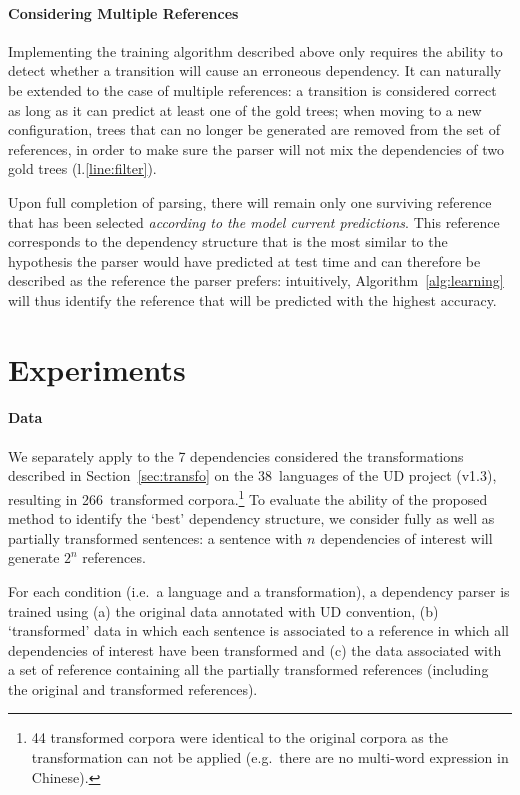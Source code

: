 \documentclass[11pt,letterpaper]{article}
\begin{document}
\paragraph*{Considering Multiple References} Implementing the training
algorithm described above only requires the ability to detect whether
a transition will cause an erroneous dependency. It can naturally be
extended to the case of multiple references: a transition is
considered correct as long as it can predict at least one of the gold
trees; when moving to a new configuration, trees that can no longer be
generated are removed from the set of references, in order to make
sure the parser will not mix the dependencies of two gold trees
(l.\ref{line:filter}).

Upon full completion of parsing, there will remain only one surviving
reference that has been selected \emph{according to the model current
  predictions}. This reference corresponds to the dependency structure
that is the most similar to the hypothesis the parser would have
predicted at test time and can therefore be described as the reference
the parser prefers: intuitively, Algorithm~\ref{alg:learning} will thus
identify the reference that will be predicted with the highest
accuracy.

\section{Experiments \label{sec:exp}}

\paragraph*{Data} We separately apply to the 7 dependencies considered
the transformations described in Section~\ref{sec:transfo} on the
38~languages of the UD project (v1.3), resulting in 266~transformed
corpora.\footnote{44 transformed corpora were identical to the
  original corpora as the transformation can not be applied (e.g.\
  there are no multi-word expression in Chinese).}  To evaluate the
ability of the proposed method to identify the `best' dependency
structure, we consider fully as well as partially transformed
sentences: a sentence with $n$ dependencies of interest will generate
$2^n$ references.

For each condition (i.e.\ a language and a transformation), a dependency
parser is trained using (a) the original data annotated with UD
convention, (b) `transformed' data in which each sentence is
associated to a reference in which all dependencies of interest have
been transformed and (c) the data associated with a set of reference
containing all the partially transformed references (including the
original and transformed references).
\end{document}

